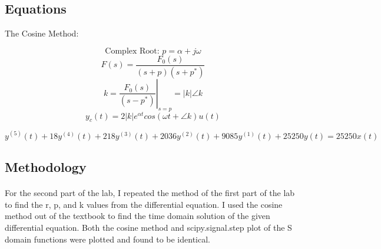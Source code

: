 \subsection{Equations}


The Cosine Method:

\[\text{Complex Root: }p=\alpha+j \omega\]
\[F(s)=\dfrac{F_{0}(s)}{(s+p)(s+p^{*})}\]
\[\left. k=\dfrac{F_{0}(s)}{(s-p^{*})}\right|_{s=p}=|k|\angle k\]
\[y_{c}(t)=2|k|e^{\alpha t}cos(\omega t+\angle k)u(t)\]


\[ y^{(5)}(t)+18y^{(4)}(t)+218y^{(3)}(t)+2036y^{(2)}(t)+9085y^{(1)}(t)+25250y(t)=25250x(t) \]

\subsection{Methodology}

\paragraph{}
For the second part of the lab, I repeated the method of the first part of the lab to find the r, p, and k values from the differential equation.  I used the cosine method out of the textbook to find the time domain solution of the given differential equation.  Both the cosine method and scipy.signal.step plot of the S domain functions were plotted and found to be identical.

